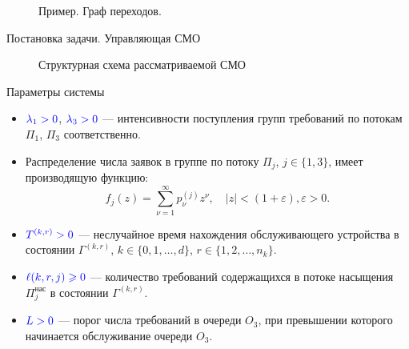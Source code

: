 \documentclass[10pt]{beamer}
\begin{document}
   \begin{figure}[h]
    \centering
    \caption{Пример. Граф переходов.}
    \label{VK:fig:4}
  \end{figure}


\begin{frame}{Постановка задачи. Управляющая СМО}
  \begin{figure}[h]
    \centering
    \caption{Структурная схема рассматриваемой СМО}
    \label{VK:fig:2}
  \end{figure}
\end{frame} 


\begin{frame}{Параметры системы}
\begin{itemize}
    \item 
$\color{blue}\lambda_1>0$, $\color{blue}\lambda_3>0$ --- интенсивности поступления групп требований по потокам  $\Pi_1$, $\Pi_3$ соответственно.
  \item 
{\color{blue}Распределение числа заявок в группе} по потоку $\Pi_j$, $j \in \{1,3\}$, имеет производящую функцию:
$$
f_j(z) = \sum_{\nu=1}^{\infty} p_{\nu}^{(j)} z ^{\nu}, \quad |z|<(1+\varepsilon), \varepsilon>0.
$$
  \item 
$\color{blue}T^{(k,r)}>0$ --- неслучайное время нахождения обслуживающего устройства в состоянии $\Gamma^{(k,r)}$, $k\in \{0, 1, \ldots, d\}$, $r \in \{1, 2, \ldots, n_k\}$.  
  \item 
$\color{blue}\ell(k,r,j)\geqslant 0$ --- количество требований содержащихся в потоке насыщения $\Pi^{\text{нас}}_j$ в состоянии  $\Gamma^{(k,r)}$.
  \item 
$\color{blue}L > 0$ --- порог числа требований в очереди $O_3$, при превышении которого начинается обслуживание очереди $O_3$.
\end{itemize}

\end{frame}
\end{document}

